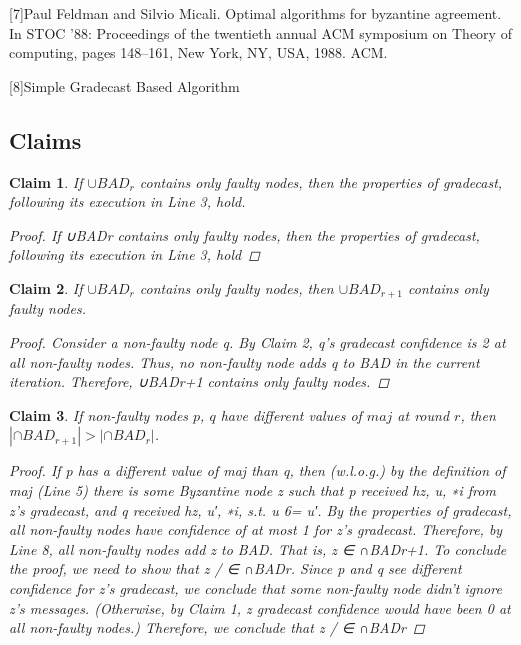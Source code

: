 \documentclass[conference]{IEEEtran}
\newtheorem{claim*}{Claim}
\begin{document}
[7]Paul Feldman and Silvio Micali. Optimal algorithms for byzantine agreement. In STOC ’88:
Proceedings of the twentieth annual ACM symposium on Theory of computing, pages 148–161,
New York, NY, USA, 1988. ACM.


[8]Simple Gradecast Based Algorithm

\begin{appendices}
\section{Claims}
\begin{claim*}
If $\cup BAD_r$ contains only faulty nodes, then the properties of gradecast, following its execution in Line 3, hold.
\begin{proof}
If ∪BADr contains only faulty nodes, then the properties of gradecast, following its execution in Line 3, hold
\end{proof}
\end{claim*}

\begin{claim*}
If $\cup BAD_r$ contains only faulty nodes, then $\cup BAD_{r+1}$ contains only faulty nodes.
\begin{proof}
Consider a non-faulty node q. By Claim 2, q’s gradecast confidence is 2 at all non-faulty
nodes. Thus, no non-faulty node adds q to BAD in the current iteration. Therefore, ∪BADr+1
contains only faulty nodes.
\end{proof}
\end{claim*}

\begin{claim*}
If non-faulty nodes $p$, $q$ have different values of $maj$ at round $r$, then $|\cap BAD_{r+1}| > | \cap BAD_r|$.
\begin{proof}
If p has a different value of maj than q, then (w.l.o.g.) by the definition of maj (Line 5)
there is some Byzantine node z such that p received hz, u, ∗i from z’s gradecast, and q received
hz, u′, ∗i, s.t. u 6= u′. By the properties of gradecast, all non-faulty nodes have confidence of at
most 1 for z’s gradecast. Therefore, by Line 8, all non-faulty nodes add z to BAD. That is,
z ∈ ∩BADr+1.
To conclude the proof, we need to show that z / ∈ ∩BADr. Since p and q see different confidence
for z’s gradecast, we conclude that some non-faulty node didn’t ignore z’s messages. (Otherwise, by
Claim 1, z gradecast confidence would have been 0 at all non-faulty nodes.) Therefore, we conclude
that z / ∈ ∩BADr
\end{proof}
\end{claim*}


\end{appendices}
\end{document}
